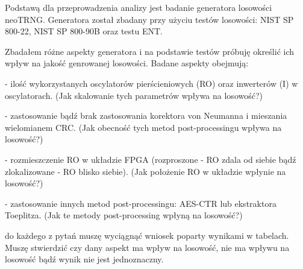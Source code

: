 
Podstawą dla przeprowadzenia analizy jest badanie generatora losowości neoTRNG. 
Generatora został zbadany przy użyciu testów losowości: NIST SP 800-22, NIST SP 800-90B 
oraz testu ENT. 

Zbadałem różne aspekty generatora i na podstawie testów próbuję określić 
ich wpływ na jakość genrowanej losowości. Badane aspekty obejmują:

- ilość wykorzystanych oscylatorów pierścieniowych (RO) oraz inwerterów (I) w oscylatorach. 
(Jak skalowanie tych parametrów wpływa na losowość?)

- zastosowanie bądź brak zastosowania korektora von Neumanna i mieszania wielomianem CRC.
(Jak obecność tych metod post-processingu wpływa na losowość?)

- rozmieszczenie RO w układzie FPGA (rozproszone - RO zdala od siebie bądź 
zlokalizowane - RO blisko siebie).
(Jak położenie RO w układzie wpłynie na losowość?)

- zastosowanie innych metod post-processingu: AES-CTR lub ekstraktora Toeplitza.
(Jak te metody post-processing wpłyną na losowość?)

do każdego z pytań muszę wyciągnąć wniosek poparty wynikami w tabelach. Muszę 
stwierdzić czy dany aspekt ma wpływ na losowość, nie ma wpływu na losowość bądź 
wynik nie jest jednoznaczny. 